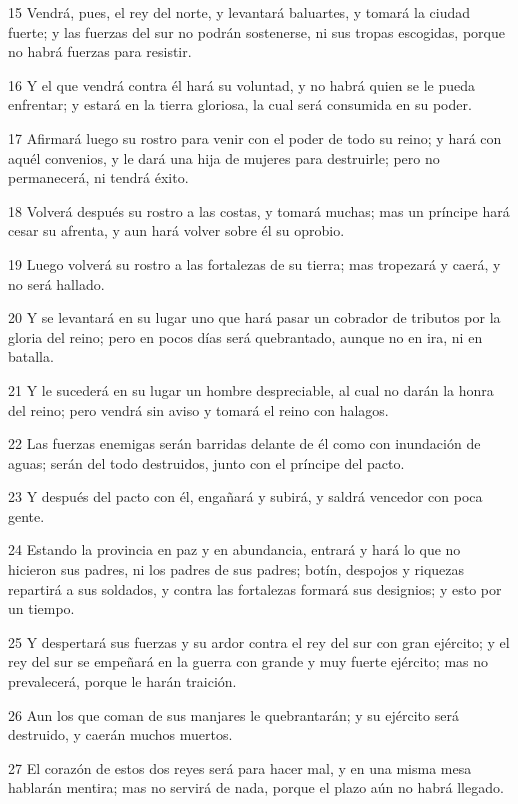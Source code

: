\par 15 Vendrá, pues, el rey del norte, y levantará baluartes, y tomará la ciudad fuerte; y las fuerzas del sur no podrán sostenerse, ni sus tropas escogidas, porque no habrá fuerzas para resistir.
\par 16 Y el que vendrá contra él hará su voluntad, y no habrá quien se le pueda enfrentar; y estará en la tierra gloriosa, la cual será consumida en su poder.
\par 17 Afirmará luego su rostro para venir con el poder de todo su reino; y hará con aquél convenios, y le dará una hija de mujeres para destruirle; pero no permanecerá, ni tendrá éxito.
\par 18 Volverá después su rostro a las costas, y tomará muchas; mas un príncipe hará cesar su afrenta, y aun hará volver sobre él su oprobio.
\par 19 Luego volverá su rostro a las fortalezas de su tierra; mas tropezará y caerá, y no será hallado.
\par 20 Y se levantará en su lugar uno que hará pasar un cobrador de tributos por la gloria del reino; pero en pocos días será quebrantado, aunque no en ira, ni en batalla.
\par 21 Y le sucederá en su lugar un hombre despreciable, al cual no darán la honra del reino; pero vendrá sin aviso y tomará el reino con halagos.
\par 22 Las fuerzas enemigas serán barridas delante de él como con inundación de aguas; serán del todo destruidos, junto con el príncipe del pacto.
\par 23 Y después del pacto con él, engañará y subirá, y saldrá vencedor con poca gente.
\par 24 Estando la provincia en paz y en abundancia, entrará y hará lo que no hicieron sus padres, ni los padres de sus padres; botín, despojos y riquezas repartirá a sus soldados, y contra las fortalezas formará sus designios; y esto por un tiempo.
\par 25 Y despertará sus fuerzas y su ardor contra el rey del sur con gran ejército; y el rey del sur se empeñará en la guerra con grande y muy fuerte ejército; mas no prevalecerá, porque le harán traición.
\par 26 Aun los que coman de sus manjares le quebrantarán; y su ejército será destruido, y caerán muchos muertos.
\par 27 El corazón de estos dos reyes será para hacer mal, y en una misma mesa hablarán mentira; mas no servirá de nada, porque el plazo aún no habrá llegado.
